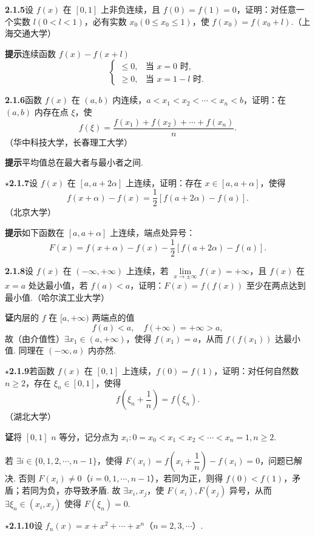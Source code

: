 \documentclass[UTF8, 12pt, fontset=fandol, oneside]{ctexart}
\begin{document}
\noindent\textbf{2.1.5}\quad 设 $f(x)$ 在 $[0,1]$ 上非负连续，且 $f(0)=f(1)=0$，证明：对任意一个实数 $l(0<l<1)$，必有实数 $x_0(0\le x_0\le1)$，使 $f(x_0)=f(x_0+l)$.（上海交通大学）

\noindent\textbf{提示}\quad 连续函数 $f(x)-f(x+l)$
\[
  \begin{cases}
    \le0, & \text{当 }x=0\text{ 时},\\
    \ge0, & \text{当 }x=1-l\text{ 时}.
  \end{cases}
\]

\noindent\textbf{2.1.6}\quad 函数 $f(x)$ 在 $(a,b)$ 内连续，$a<x_1<x_2<\cdots<x_n<b$，证明：在 $(a,b)$ 内存在点 $\xi$，使
\[
  f(\xi)=\frac{f(x_1)+f(x_2)+\cdots+f(x_n)}{n}.
\]
（华中科技大学，长春理工大学）

\noindent\textbf{提示}\quad 平均值总在最大者与最小者之间.

\noindent\textbf{$\star$2.1.7}\quad 设 $f(x)$ 在 $[a,a+2\alpha]$ 上连续，证明：存在 $x\in[a,a+\alpha]$，使得
\[
  f(x+\alpha)-f(x)=\frac12[f(a+2\alpha)-f(a)].
\tag{1}
\]
（北京大学）

\noindent\textbf{提示}\quad 如下函数在 $[a,a+\alpha]$ 上连续，端点处异号：
\[
  F(x)=f(x+\alpha)-f(x)-\frac12[f(a+2\alpha)-f(a)].
\]

\noindent\textbf{2.1.8}\quad 设 $f(x)$ 在 $(-\infty,+\infty)$ 上连续，若 $\lim\limits_{x\to\pm\infty}f(x)=+\infty$，且 $f(x)$ 在 $x=a$ 处达最小值，若 $f(a)<a$，证明：$F(x)=f(f(x))$ 至少在两点达到最小值.（哈尔滨工业大学）

\noindent\textbf{证}\quad 内层的 $f$ 在 $[a,+\infty)$ 两端点的值
\[
  f(a)<a,\quad f(+\infty)=+\infty>a,
\]
故（由介值性）$\exists x_1\in(a,+\infty)$，使得 $f(x_1)=a$，从而 $f(f(x_1))$ 达最小值. 同理在 $(-\infty,a)$ 内亦然.

\noindent\textbf{$\star$2.1.9}\quad 若函数 $f(x)$ 在 $[0,1]$ 上连续，$f(0)=f(1)$，证明：对任何自然数 $n\ge2$，存在 $\xi_n\in[0,1]$，使得
\[
  f\left(\xi_n+\frac1n\right)=f(\xi_n).
\]
（湖北大学）

\noindent\textbf{证}\quad 将 $[0,1]$ $n$ 等分，记分点为 $x_i:0=x_0<x_1<x_2<\cdots<x_n=1,n\ge2$.

若 $\exists i\in\{0,1,2,\cdots,n-1\}$，使得 $F(x_i)=f\left(x_i+\dfrac1n\right)-f(x_i)=0$，问题已解决. 否则 $F(x_i)\ne0$（$i=0,1,\cdots,n-1$），若同为正，则得 $f(0)<f(1)$，矛盾；若同为负，亦导致矛盾. 故 $\exists x_i,x_j$，使 $F(x_i),F(x_j)$ 异号，从而 $\exists\xi_n\in(x_i,x_j)$ 使得 $F(\xi_n)=0$.

\noindent\textbf{$\star$2.1.10}\quad 设 $f_n(x)=x+x^2+\cdots+x^n$（$n=2,3,\cdots$）.
\end{document}
